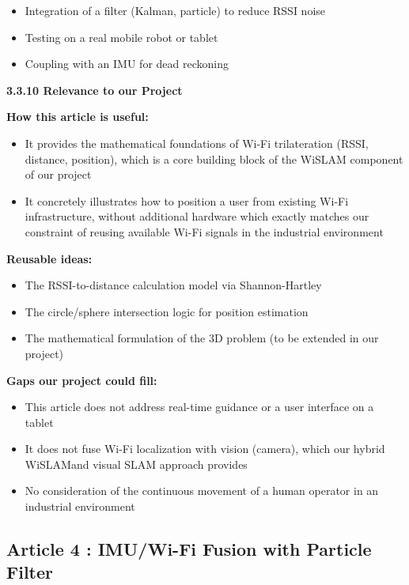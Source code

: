 \documentclass{ipgpmaster}
\begin{document}
\begin{itemize}
    \item Integration of a filter (Kalman, particle) to reduce RSSI noise
    \item Testing on a real mobile robot or tablet
    \item Coupling with an IMU for dead reckoning

\end{itemize}
 \textbf{3.3.10      Relevance to our Project}

\textbf{How this article is useful:}

\begin{itemize}
    \item It provides the mathematical foundations of Wi-Fi trilateration (RSSI,  distance, position), which is a core building block of the WiSLAM component of our project
    \item It concretely illustrates how to position a user from existing Wi-Fi infrastructure, without additional hardware which exactly matches our constraint of reusing available Wi-Fi signals in the industrial environment
\end{itemize}
\textbf{Reusable ideas:}

\begin{itemize}
    \item The RSSI-to-distance calculation model via Shannon-Hartley
    \item The circle/sphere intersection logic for position estimation
    \item The mathematical formulation of the 3D problem (to be extended in our project)
\end{itemize}
\textbf{Gaps our project could fill:}

\begin{itemize}
    \item This article does not address real-time guidance or a user interface on a tablet
    \item It does not fuse Wi-Fi localization with vision (camera), which our hybrid WiSLAMand  visual SLAM approach provides
    \item No consideration of the continuous movement of a human operator in an industrial environment
\end{itemize}
 
\subsection{Article 4 :  IMU/Wi-Fi Fusion with Particle Filter\textbf{ }
}
\end{document}
